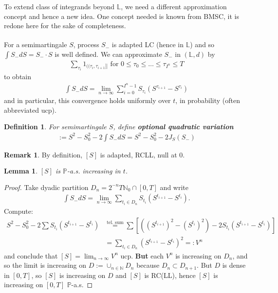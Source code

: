 \documentclass[12pt,a4paper, twoside]{article}
\newtheorem{lem}{Lemma}[section]
\newtheorem{defn}{Definition}[section]
\theoremstyle{definition}
\newtheorem{rem}{Remark}[section]
\newcommand{\PP}{\mathbb{P}} %
\begin{document}
\newpage
To extend class of integrands beyond $\mathbb{L}$, we need a different approximation concept and hence a new idea. One concept needed is known from BMSC, it is redone here for the sake of completeness. 
\\\\
For a semimartingale $S$, process $S_-$ is adapted LC (hence in $\mathbb{L}$) and so  $\int S_- dS = S_- \cdot S$ is well defined. We can approximate $S_-$ in $( \mathbb{L},d)$ by
\begin{align*}
\sum_{\tau_i} 1_{(\!( \tau_i, \tau_{i+1}]\!]} \text{ for } 0 \leq \tau_0 \leq \dots \leq \tau_{I^n} \leq T
\end{align*}
to obtain
\begin{align*}
\int S_- dS = \lim_{n \to \infty} \sum_{i=0}^{I^n-1} S_{\tau_i}( S^{\tau_{i+1}}- S^{\tau_i})  \tag{for $d_E'$}
\end{align*}
and in particular, this convergence holds uniformly over $t$, in probability (often abbreviated ucp). 
\begin{defn} For semimartingale $S$, define \textbf{optional quadratic variation}
\begin{align*}
[S]:= S^2-S_0^2-2 \int S_- dS = S^2-S_0^2- 2 J_S(S_-)
\end{align*} 
\end{defn}
\begin{rem} By definition, $[S]$ is adapted, RCLL, null at $0$. 
\end{rem}
\begin{lem} \label{L36} $[S]$ is $\PP$-a.s. increasing in $t$. 
\end{lem}
\begin{proof}
Take dyadic partition $D_n = 2^{-n} T \mathbb{N}_0 \cap [0,T]$ and write 
\begin{align*}
\int S_- dS = \lim_{n \to \infty} \sum_{t_i \in D_n} S_{t_i} ( S^{t_{i+1}}-S^{t_i}).
\end{align*}
Compute:
\begin{align*}
S^2-S_0^2- 2\sum S_{t_i} (S^{t_{i+1}}-S^{t_i}) &\overset{\text{tel. sum}}= \sum \left[ ((S^{t_{i+1}})^2-(S^{t_i})^2)-2 S_{t_i}(S^{t_{i+1}}-S^{t_i}) \right] \\
& = \sum_{t_i \in D_n} (S^{t_{i+1}}-S^{t_i})^2 =:V^n
\end{align*}
and conclude that $[S] = \lim_{n \to \infty} V^n$ ucp. \textbf{But} each $V^n$ is increasing on $D_n$, and so the limit is increasing on $D:= \cup_{n \in \mathbb{N}} D_n$ because $D_n \subset D_{n+1}$. But $D$ is dense in $[0,T]$, so $[S]$ is increasing on $D$ and $[S]$ is RC(LL),  hence $[S]$ is increasing on $[0,T] $ $\PP$-a.s.
\end{proof}
\end{document}
